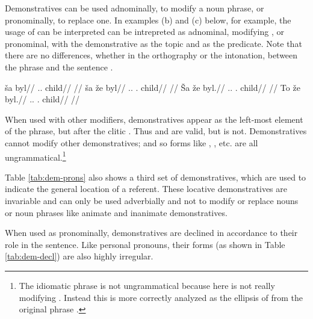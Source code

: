 Demonstratives can be used adnominally, to modify a noun phrase, or
pronominally, to replace one. In examples (b) and (c) below, for example, the
usage of  can be interpreted can be intrepreted as adnominal, modifying
, or pronominal, with the demonstrative as the topic and  as the predicate. Note that there are no differences, whether in the
orthography or the intonation, between the phrase  and the
sentence .

\pex
    \a
        \begingl
        \gla ša byl//
        \glb \Dem{}.\Prox{}.\Anim{} child//
        \glft {}//
        \endgl
    \a
        \begingl
        \gla ša že byl//
        \glb \Dem{}.\Prox{}.\Anim{} \First\Sg{}.\Gen{} child//
        \glft {}//
        \endgl
    \a
        \begingl
        \gla Ša že byl.//
        \glb \Dem{}.\Prox{}.\Anim{} \First\Sg{}.\Gen{} child//
        \glft {}//
        \endgl
    \a
        \begingl
        \gla \ljudge{*}To že byl.//
        \glb \Dem{}.\Prox{}.\Inan{} \First\Sg{}.\Gen{} child//
        \glft {}//
        \endgl
\xe

When used with other modifiers, demonstratives appear as the left-most element
of the phrase, but after the clitic . Thus  and  are valid, but
 is not. Demonstratives cannot modify other
demonstratives; and so forms like , , etc. are all
ungrammatical.\footnote{The idiomatic phrase  is
not ungrammatical because here  is not really modifying .
Instead this is more correctly analyzed as the ellipsis of  from
the original phrase .}

Table \ref{tab:dem-prons} also shows a third set of demonstratives, which are
used to indicate the general location of a referent. These locative
demonstratives are invariable and can only be used adverbially and not to modify
or replace nouns or noun phrases like animate and inanimate demonstratives.

When used as pronominally, demonstratives are declined in accordance to their
role in the sentence. Like personal pronouns, their forms (as shown in Table
\ref{tab:dem-decl}) are also highly irregular.

